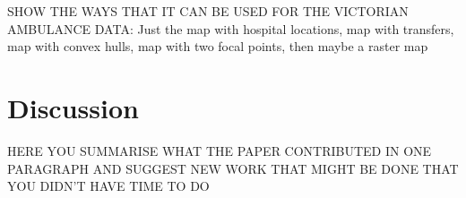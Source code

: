 SHOW THE WAYS THAT IT CAN BE USED FOR THE VICTORIAN AMBULANCE DATA: Just the map with hospital locations, map with transfers, map with convex hulls, map with two focal points, then maybe a raster map

\section{Discussion}\label{discussion}

HERE YOU SUMMARISE WHAT THE PAPER CONTRIBUTED IN ONE PARAGRAPH AND SUGGEST NEW WORK THAT MIGHT BE DONE THAT YOU DIDN'T HAVE TIME TO DO



\address{%
Thanh Cuong Nguyen\\
Monash University\\%
Department of Econometrics and Business Statistics\\ Melbourne, Australia\\
%
\url{https://alex-nguyen-vn.github.io}\\%
\textit{ORCiD: \href{https://orcid.org/0000-0000-0000-0000}{0000-0000-0000-0000}}\\%
\href{mailto:thanhcuong10091992@gmail.com}{\nolinkurl{thanhcuong10091992@gmail.com}}%
}

\address{%
Michael Lydeamore\\
Monash University\\%
Department of Econometrics and Business Statistics\\ Melbourne, Australia\\
%
\url{https://www.michaellydeamore.com}\\%
\textit{ORCiD: \href{https://orcid.org/0000-0001-6515-827X}{0000-0001-6515-827X}}\\%
\href{mailto:michael.lydeamore@monash.edu}{\nolinkurl{michael.lydeamore@monash.edu}}%
}

\address{%
Dianne Cook\\
Monash University\\%
Department of Econometrics and Business Statistics\\ Melbourne, Australia\\
%
\url{https://www.dicook.org}\\%
\textit{ORCiD: \href{https://orcid.org/0000-0002-3813-7155}{0000-0002-3813-7155}}\\%
\href{mailto:dicook@monash.edu}{\nolinkurl{dicook@monash.edu}}%
}
